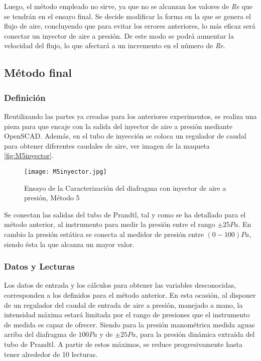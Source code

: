 Luego, el método empleado no sirve, ya que no se alcanzan los valores de
\emph{Re} que se tendrán en el ensayo final. Se decide modificar la
forma en la que se genera el flujo de aire, concluyendo que para evitar
los errores anteriores, lo más eficaz será conectar un inyector de aire
a presión. De este modo se podrá aumentar la velocidad del flujo, lo que
afectará a un incremento en el número de \emph{Re}.

\subsection{Método final}\label{header-n453}

\subsubsection{Definición}\label{header-n454}

Reutilizando las partes ya creadas para los anteriores experimentos, se
realiza una pieza para que encaje con la salida del inyector de aire a
presión mediante OpenSCAD. Además, en el tubo de inyección se coloca un
regulador de caudal para obtener diferentes caudales de aire, ver imagen de la maqueta \autoref{fig:M5inyector}.

\begin{figure}[hb]
\centering
\texttt{[image: M5inyector.jpg]}
\caption[Caracterización del diafragma con inyector de aire a presión]{Ensayo de la Caracterización del diafragma con inyector de aire a presión, Método 5}
\label{fig:M5inyector}
\end{figure}

Se conectan las salidas del tubo de Prandtl, tal y como se ha detallado
para el método anterior, al instrumento para medir la presión entre el
rango \(\pm 25Pa\). En cambio la presión estática se conecta al medidor
de presión entre \((0-100)Pa\), siendo ésta la que alcanza un mayor
valor.

\subsubsection{Datos y Lecturas}\label{header-n467}

Los datos de entrada y los cálculos para obtener las variables
desconocidas, corresponden a los definidos para el método anterior. En
esta ocasión, al disponer de un regulador del caudal de entrada de aire
a presión, manejado a mano, la intensidad máxima estará limitada por el
rango de presiones que el instrumento de medida es capaz de ofrecer.
Siendo para la presión manométrica medida aguas arriba del diafragma de
\(100Pa\) y de \(\pm 25 Pa\), para la presión dinámica extraída del tubo
de Prandtl. A partir de estos máximos, se reduce progresivamente hasta
tener alrededor de 10 lecturas.

